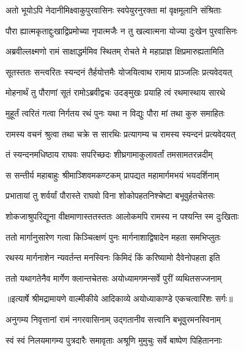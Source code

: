 \twolineshloka
{अतो भूयोऽपि नेदानीमिक्ष्वाकुपुरवासिनः}
{स्वपेयुरनुरक्ता मां वृक्षमूलानि संश्रिताः} %

\twolineshloka
{पौरा ह्यात्मकृताद्दुःखाद्विप्रमोच्या नृपात्मजैः}
{न तु खल्वात्मना योज्या दुःखेन पुरवासिनः} %

\twolineshloka
{अब्रवील्लक्ष्मणो रामं साक्षाद्धर्ममिव स्थितम्}
{रोचते मे महाप्राज्ञ क्षिप्रमारुह्यतामिति} %

\twolineshloka
{सूतस्ततः सन्त्वरितः स्यन्दनं तैर्हयोत्तमैः}
{योजयित्वाथ रामाय प्राञ्जलिः प्रत्यवेदयत्} %

\twolineshloka
{मोहनार्थं तु पौराणां सूतं रामोऽब्रवीद्वचः}
{उदङ्मुखः प्रयाहि त्वं रथमास्थाय सारथे} %

\twolineshloka
{मुहूर्तं त्वरितं गत्वा निर्गतय रथं पुनः}
{यथा न विद्युः पौरा मां तथा कुरु समाहितः} %

\twolineshloka
{रामस्य वचनं श्रुत्वा तथा चक्रे स सारथिः}
{प्रत्यागम्य च रामस्य स्यन्दनं प्रत्यवेदयत्} %

\twolineshloka
{तं स्यन्दनमधिष्ठाय राघवः सपरिच्छदः}
{शीघ्रगामाकुलावर्तां तमसामतरन्नदीम्} %

\twolineshloka
{स सन्तीर्य महाबाहुः श्रीमाञ्शिवमकण्टकम्}
{प्रापद्यत महामार्गमभयं भयदर्शिनाम्} %

\twolineshloka
{प्रभातायां तु शर्वर्यां पौरास्ते राघवो विना}
{शोकोपहतनिश्चेष्टा बभूवुर्हतचेतसः} %

\twolineshloka
{शोकजाश्रुपरिद्यूना वीक्षमाणास्ततस्ततः}
{आलोकमपि रामस्य न पश्यन्ति स्म दुःखिताः} %

\twolineshloka
{ततो मार्गानुसारेण गत्वा किञ्चित्क्षणं पुनः}
{मार्गनाशाद्विषादेन महता समभिप्लुतः} %

\twolineshloka
{रथस्य मार्गनाशेन न्यवर्तन्त मनस्विनः}
{किमिदं किं करिष्यामो दैवेनोपहता इति} %

\twolineshloka
{ततो यथागतेनैव मार्गेण क्लान्तचेतसः}
{अयोध्यामगमन्सर्वे पुरीं व्यथितसज्जनाम्} %


{॥इत्यार्षे श्रीमद्रामायणे वाल्मीकीये आदिकाव्ये अयोध्याकाण्डे एकचत्वारिंशः सर्गः॥}


\twolineshloka
{अनुगम्य निवृत्तानां रामं नगरवासिनाम्}
{उद्गतानीव सत्त्वानि बभूवुरमनस्विनाम्} %

\twolineshloka
{स्वं स्वं निलयमागम्य पुत्रदारैः समावृताः}
{अश्रूणि मुमुचुः सर्वे बाष्पेण पिहिताननाः} %


